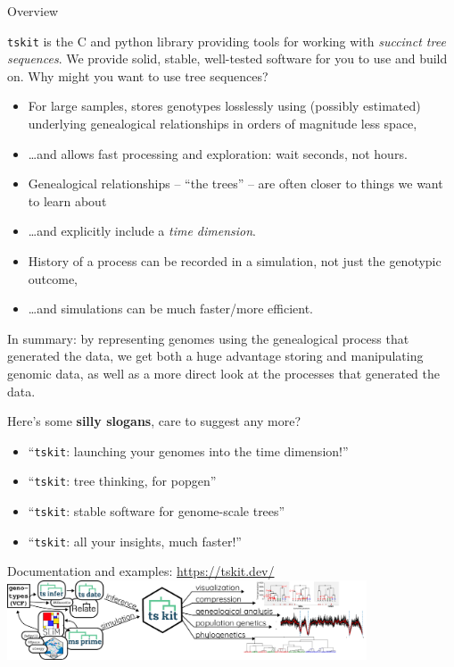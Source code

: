 \documentclass[landscape,a0paper,fontscale=0.4]{baposter}
\newcommand{\tskit}{{\texttt{tskit}}}
\newcommand{\compresslist}{%
 \setlength{\itemsep}{1pt}%
 \setlength{\parskip}{0pt}%
 \setlength{\parsep}{0pt}%
 }
\begin{document}
\begin{poster}
\begin{posterbox}[name=overview,column=1,row=0,span=2]{Overview}
\begin{multicols}{2}

\tskit{} is the C and python library providing tools for working with \emph{succinct tree sequences}.
We provide solid, stable, well-tested software for you to use and build on.
Why might you want to use tree sequences?
\begin{itemize} \compresslist
    \item For large samples,
        stores genotypes losslessly using (possibly estimated) underlying genealogical relationships
        in orders of magnitude less space,
    \item \ldots and allows fast processing and exploration: wait seconds, not hours.
    \item Genealogical relationships -- ``the trees'' -- are often closer to
        things we want to learn about
    \item \ldots and explicitly include a \emph{time dimension}.
    \item History of a process can be recorded in a simulation, not just the genotypic outcome,
    \item \ldots and simulations can be much faster/more efficient.
\end{itemize}

In summary:
by representing genomes using the genealogical process that generated the data,
we get both a huge advantage storing and manipulating genomic data,
as well as a more direct look at the processes that generated the data.

Here's some \textbf{silly slogans}, care to suggest any more?
\begin{itemize} \compresslist
    \item ``\tskit: launching your genomes into the time dimension!''
    \item ``\tskit: tree thinking, for popgen''
    \item ``\tskit: stable software for genome-scale trees''
    \item ``\tskit: all your insights, much faster!''
\end{itemize}

\end{multicols}

\begin{center} \Large
    Documentation and examples: \url{https://tskit.dev/}
    \includegraphics[width=0.8\textwidth]{workflow}
\end{center}



\end{posterbox}
\end{poster}
\end{document}
